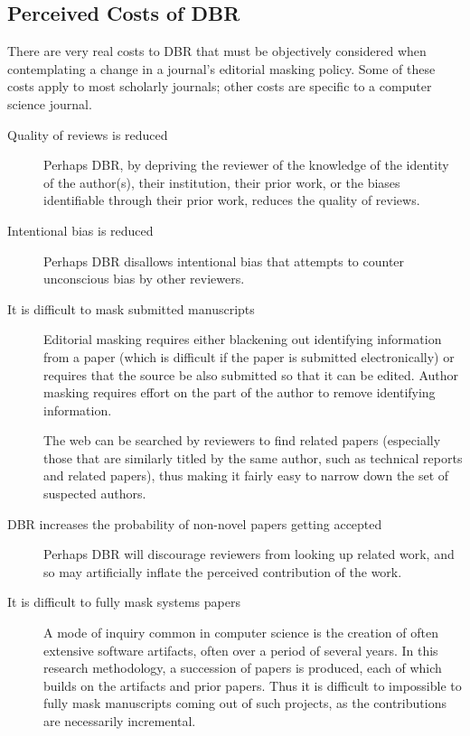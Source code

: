 \documentclass[acmtods,acmnow]{acmtrans2m}
\begin{document}
\subsection{Perceived Costs of DBR}\label{sec:costs}
There are very real costs to DBR that must be objectively
considered when contemplating a change in a journal's editorial masking
policy. Some of these costs apply to most scholarly journals; other costs
are specific to a computer science journal.

\begin{description}
\item[Quality of reviews is reduced] Perhaps DBR, by
depriving the reviewer of the knowledge of the identity of the author(s),
their institution, their prior work, or the biases identifiable through
their prior work, reduces the quality of reviews.

\item[Intentional bias is reduced] Perhaps DBR disallows intentional bias
that attempts to counter unconscious bias by other reviewers.

\item[It is difficult to mask submitted manuscripts]
Editorial masking requires either blackening out identifying information
from a paper (which is difficult if the paper is submitted electronically)
or requires that the source be also submitted so that it can be
edited. Author masking requires effort on the part of the author to remove
identifying information.

The web can be searched by reviewers to find related
papers (especially those that are similarly titled by the same author, such
as technical reports and related papers), thus making it fairly easy to
narrow down the set of suspected authors.

\item[DBR increases the probability of non-novel papers getting accepted]
Perhaps DBR will discourage reviewers from looking up related work, and so
may artificially inflate the perceived contribution of the work.

\item[It is difficult to fully mask systems papers]
A mode of inquiry common in computer science is the creation of often
extensive software artifacts, often over a period of several
years. In this research methodology, a succession of papers is produced,
each of which builds on the artifacts and prior papers. Thus it is difficult
to impossible to fully mask manuscripts coming out of such projects, as the
contributions are necessarily incremental.


\end{description}
\end{document}
